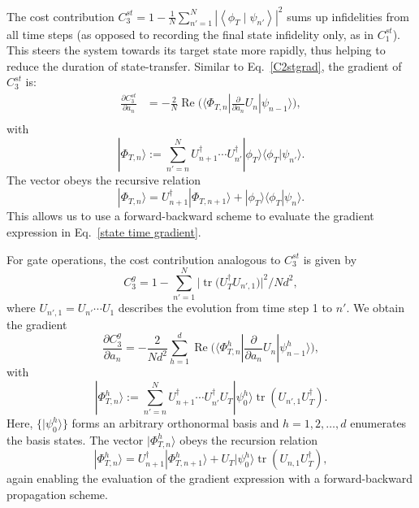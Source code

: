 \documentclass[12pt]{article}
\DeclareMathOperator{\Real}{Re}
\newcommand{\dket}[1]{|#1\rangle}
\begin{document}
The cost contribution $C_3^{st}=1-\frac{1}{N}\sum_{n'=1}^N \left|\left\langle\phi_{T} \mid \psi_{n'}\right\rangle\right|^{2}$ sums up infidelities from all time steps (as opposed to recording the final state infidelity only, as in $C_1^{st}$). This steers the system towards its target state more rapidly, thus helping to reduce the duration of state-transfer. Similar to Eq.\ \eqref{C2stgrad}, the gradient of $C_3^{st}$ is:
\begin{equation}
\begin{aligned}
\label{state time gradient}
  \frac{\partial C_3^{st} }{\partial a_{n}}
  &=-\frac{2}{N}\Real\big(\langle \Phi_{T,n}|\frac {\partial }{\partial a_{n}}U_n|\psi_{n-1}\rangle\big) ,\\
\end{aligned}
\end{equation}
with 
\begin{equation}
    \dket{\Phi_{T,n}}:=\sum_{n'=n}^NU_{n+1}^\dagger \cdots U_{n'}^\dagger\dket{\phi_T}\langle\phi_{T}|\psi_{n'}\rangle.
\end{equation}
The vector obeys the recursive relation
\begin{equation}
\dket{\Phi_{T,n}}=U^\dagger_{n+1}\dket{\Phi_{T,n+1}}+\dket{\phi_T}\langle\phi_T|\psi_n\rangle.
\end{equation}
This allows us to use a forward-backward scheme to evaluate the gradient expression in Eq.\ \eqref{state time gradient}.

For gate operations, the cost contribution analogous to $C_3^{st}$ is given by 
\begin{equation}
    C_3^{ g}=1- \sum_{n'=1}^N\big|\operatorname{tr}\big(U_T^\dagger  U_{n',1}\big)\big|^{2}/Nd^2,
\end{equation}
where $U_{n',1}=U_{n'}\cdots U_1$ describes the evolution from time step 1 to $n'$. We obtain the gradient
\begin{equation}
  \frac{\partial C_3^{ g} }{\partial a_{n}}=
  -\frac{2}{Nd^2}\sum_{h=1}^d \Real  \big(\langle \Phi_{T,n}^h|\frac {\partial }{\partial a_{n}}U_n|\psi_{n-1}^h\rangle\big),
\end{equation}
with
\begin{equation}
\dket{\Phi_{T,n}^h}:=\sum_{n'=n}^N U_{n+1}^\dagger \cdots U_{n'}^\dagger U_T\dket{\psi_0^h} \operatorname{tr}( U_{n',1}U_T^{\dagger}).
\end{equation}
Here, $\{\dket{\psi_0^h}\}$ forms an arbitrary orthonormal basis and 
$h=1,2,\ldots,d$ enumerates the basis states. The vector $\dket{\Phi_{T,n}^h}$ obeys the recursion relation
\begin{equation}
\dket{\Phi_{T,n}^h}=U_{n+1}^\dagger\dket{\Phi_{T,n+1}^h}+U_T\dket{\psi_0^h}\operatorname{tr}( U_{n,1}U_T^{\dagger}),
\end{equation}
again enabling the evaluation of the gradient expression with a forward-backward propagation scheme.
\end{document}
